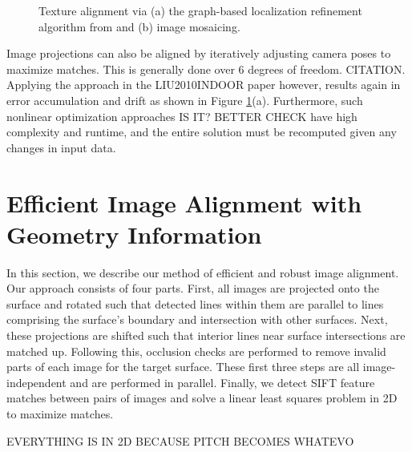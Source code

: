 \documentclass[]{spie}  %
\begin{document}
\begin{figure}
  \centering

  \centering {}
  \caption{Texture alignment via (a) the graph-based localization
    refinement algorithm from \cite{chen2010indoor} and (b) image
    mosaicing.}
  \label{fig:mosaic3D}
\end{figure}

Image projections can also be aligned by iteratively adjusting camera
poses to maximize matches. This is generally done over 6 degrees of
freedom. CITATION. Applying the approach in the LIU2010INDOOR paper
however, results again in error accumulation and drift as shown in
Figure \ref{fig:mosaic3D}(a). Furthermore, such nonlinear optimization
approaches IS IT? BETTER CHECK have high complexity and runtime, and the
entire solution must be recomputed given any changes in input data.


\section{Efficient Image Alignment with Geometry Information}

In this section, we describe our method of efficient and robust image
alignment. Our approach consists of four parts. First, all images are
projected onto the surface and rotated such that detected lines within
them are parallel to lines comprising the surface's boundary and
intersection with other surfaces. Next, these projections are shifted
such that interior lines near surface intersections are matched
up. Following this, occlusion checks are performed to remove invalid
parts of each image for the target surface. These first three steps
are all image-independent and are performed in parallel. Finally, we
detect SIFT feature matches between pairs of images and solve a linear
least squares problem in 2D to maximize matches.

EVERYTHING IS IN 2D BECAUSE PITCH BECOMES WHATEVO
\end{document}
